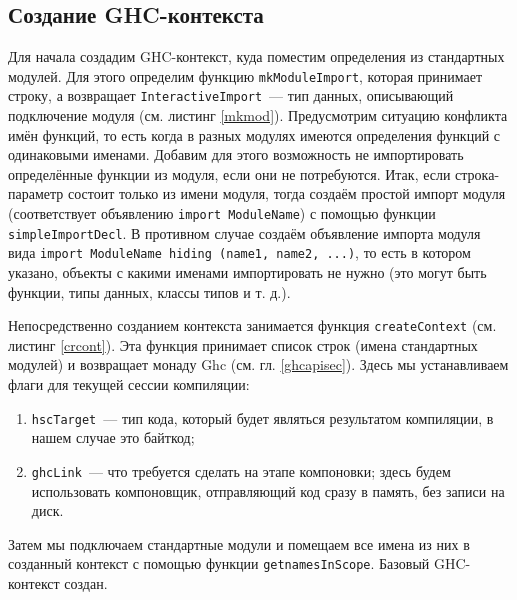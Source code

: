 	\subsection{Создание GHC-контекста}
		Для начала создадим GHC-контекст, куда поместим определения из стандартных модулей. Для этого определим функцию \lstinline!mkModuleImport!, которая принимает строку, а возвращает \lstinline!InteractiveImport!~--- тип данных, описывающий подключение модуля (см. листинг \ref{mkmod}). Предусмотрим ситуацию конфликта имён функций, то есть когда в разных модулях имеются определения функций с одинаковыми именами. Добавим для этого возможность не импортировать определённые функции из модуля, если они не потребуются. Итак, если строка-параметр состоит только из имени модуля, тогда создаём простой импорт модуля (соответствует объявлению \lstinline!import ModuleName!) с помощью функции \lstinline!simpleImportDecl!. В противном случае создаём объявление импорта модуля вида \lstinline!import ModuleName hiding (name1, name2, ...)!, то есть в котором указано, объекты с какими именами импортировать не нужно (это могут быть функции, типы данных, классы типов и т. д.).
		
		Непосредственно созданием контекста занимается функция \lstinline!createContext! (см. листинг \ref{crcont}). Эта функция принимает список строк (имена стандартных модулей) и возвращает монаду Ghc (см. гл. \ref{ghcapisec}). Здесь мы устанавливаем флаги для текущей сессии компиляции:
		\begin{enumerate}[1)]
			\item \lstinline!hscTarget!~--- тип кода, который будет являться результатом компиляции, в нашем случае это байткод;
			\item \lstinline!ghcLink!~--- что требуется сделать на этапе компоновки; здесь будем использовать компоновщик, отправляющий код сразу в память, без записи на диск.
		\end{enumerate}
	
		Затем мы подключаем стандартные модули и помещаем все имена из них в созданный контекст с помощью функции \lstinline!getnamesInScope!. Базовый GHC-контекст создан.
		
